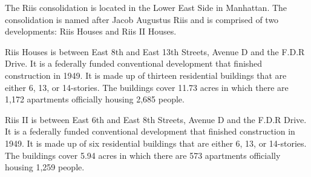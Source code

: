 

The Riis consolidation is located in the Lower East Side in Manhattan. The consolidation is named after Jacob Augustus Riis and is comprised of two developments: Riis Houses and Riis II Houses.

Riis Houses is between East 8th and East 13th Streets, Avenue D and the F.D.R Drive. It is a federally funded conventional development that finished construction in 1949. It is made up of thirteen residential buildings that are either 6, 13, or 14-stories. The buildings cover 11.73 acres in which there are 1,172 apartments officially housing 2,685 people. 

Riis II is between East 6th and East 8th Streets, Avenue D and the F.D.R Drive. It is a federally funded conventional development that finished construction in 1949. It is made up of six residential buildings that are either 6, 13, or 14-stories. The buildings cover 5.94 acres in which there are 573 apartments officially housing 1,259 people. 